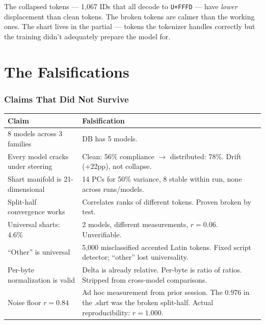 \documentclass[11pt,a4paper]{article}
\begin{document}
The collapsed tokens --- 1,067 IDs that all decode to \texttt{U+FFFD} --- have \textit{lower} displacement than clean tokens. The broken tokens are calmer than the working ones. The shart lives in the partial --- tokens the tokenizer handles correctly but the training didn't adequately prepare the model for.

\part{The Falsifications}

\section{Claims That Did Not Survive}

\begin{center}
\begin{longtable}{p{4.5cm}p{8.5cm}}
\toprule
\textbf{Claim} & \textbf{Falsification} \\
\midrule
\endhead
8 models across 3 families & DB has 5 models. \\
Every model cracks under steering & Clean: 56\% compliance $\to$ distributed: 78\%. Drift (+22pp), not collapse. \\
Shart manifold is 21-dimensional & 14 PCs for 50\% variance, 8 stable within run, none across runs/models. \\
Split-half convergence works & Correlates ranks of different tokens. Proven broken by test. \\
Universal sharts: 4.6\% & 2 models, different measurements, $r = 0.06$. Unverifiable. \\
``Other'' is universal & 5,000 misclassified accented Latin tokens. Fixed script detector; ``other'' lost universality. \\
Per-byte normalization is valid & Delta is already relative. Per-byte is ratio of ratios. Stripped from cross-model comparisons. \\
Noise floor $r = 0.84$ & Ad hoc measurement from prior session. The 0.976 in the .shrt was the broken split-half. Actual reproducibility: $r = 1.000$. \\
\bottomrule
\end{longtable}
\end{center}
\end{document}
